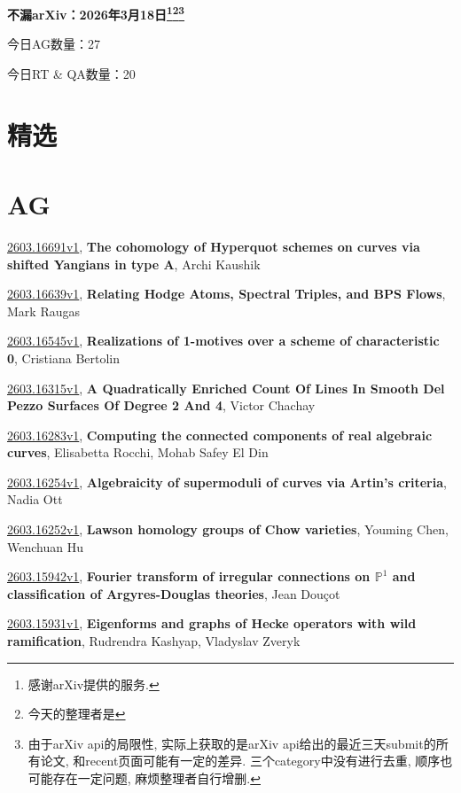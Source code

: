\documentclass[9pt, a4paper]{article}
\theoremstyle{plain}
\theoremstyle{definition}
\theoremstyle{remark}
\newcommand{\arxiv}[3]{\href{https://arxiv.org/abs/#1}{#1}, \textbf{\textcolor{arxivblue}{#2}}, #3}
\newcommand{\AGnumber}{27}
\newcommand{\RTQAnumber}{20}
\newcommand{\NewestDate}{2026年3月18日}
\newcommand{\todayarXiver}{} %
\begin{document}
\begin{center}
    \Huge\textbf{不漏arXiv：\NewestDate\footnote{感谢arXiv提供的服务.}\footnote{今天的整理者是\todayarXiver}\footnote{由于arXiv api的局限性, 实际上获取的是arXiv api给出的最近三天submit的所有论文, 和recent页面可能有一定的差异. 三个category中没有进行去重, 顺序也可能存在一定问题, 麻烦整理者自行增删.}} \\
\end{center}

\setcounter{section}{-1}

\begin{center}
    今日AG数量：\AGnumber
    
    今日RT \& QA数量：\RTQAnumber
    
\end{center}


\section{精选}


\section{AG}
\arxiv{2603.16691v1}{The cohomology of Hyperquot schemes on curves via shifted Yangians in type A}{Archi Kaushik}

\arxiv{2603.16639v1}{Relating Hodge Atoms, Spectral Triples, and BPS Flows}{Mark Raugas}

\arxiv{2603.16545v1}{Realizations of 1-motives over a scheme of characteristic 0}{Cristiana Bertolin}

\arxiv{2603.16315v1}{A Quadratically Enriched Count Of Lines In Smooth Del Pezzo Surfaces Of Degree 2 And 4}{Victor Chachay}

\arxiv{2603.16283v1}{Computing the connected components of real algebraic curves}{Elisabetta Rocchi, Mohab Safey El Din}

\arxiv{2603.16254v1}{Algebraicity of supermoduli of curves via Artin's criteria}{Nadia Ott}

\arxiv{2603.16252v1}{Lawson homology groups of Chow varieties}{Youming Chen, Wenchuan Hu}

\arxiv{2603.15942v1}{Fourier transform of irregular connections on $\mathbb P^1$ and classification of Argyres-Douglas theories}{Jean Douçot}

\arxiv{2603.15931v1}{Eigenforms and graphs of Hecke operators with wild ramification}{Rudrendra Kashyap, Vladyslav Zveryk}
\end{document}
